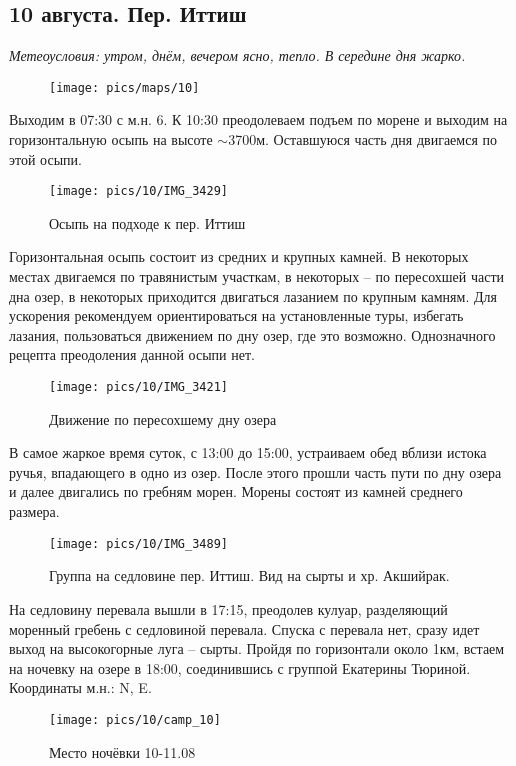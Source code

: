 \subsection{10 августа. Пер. Иттиш}
\textit{Метеоусловия: утром, днём, вечером ясно, тепло. В середине дня жарко.}

\begin{figure}[h!]
	\centering
		\texttt{[image: pics/maps/10]}
	\label{fig:mini_10}
\end{figure}

Выходим в \alert{07:30} с м.н. 6. К \alert{10:30} преодолеваем подъем по морене и выходим на горизонтальную осыпь на высоте $\sim$3700м. Оставшуюся часть дня двигаемся по этой осыпи.

\begin{figure}[h!]
	\centering
	\texttt{[image: pics/10/IMG\_3429]}
	\caption{Осыпь на подходе к пер. Иттиш}
	\label{fig:IMG_3429}
\end{figure}

Горизонтальная осыпь состоит из средних и крупных камней. В некоторых местах двигаемся по травянистым участкам, в некоторых -- по пересохшей части дна озер, в некоторых приходится двигаться лазанием по крупным камням. Для ускорения рекомендуем ориентироваться на установленные туры, избегать лазания, пользоваться движением по дну озер, где это возможно. Однозначного рецепта преодоления данной осыпи нет.

\begin{figure}[h!]
	\centering
	\texttt{[image: pics/10/IMG\_3421]}
	\caption{Движение по пересохшему дну озера}
	\label{fig:IMG_3421}
\end{figure}

В самое жаркое время суток, с 13:00 до 15:00, устраиваем обед вблизи истока ручья, впадающего в одно из озер. После этого прошли часть пути по дну озера и далее двигались по гребням морен. Морены состоят из камней среднего размера.

\begin{figure}[h!]
	\centering
	\texttt{[image: pics/10/IMG\_3489]}
	\caption{Группа на седловине пер. Иттиш. Вид на сырты и хр. Акшийрак.}
	\label{fig:IMG_3489}
\end{figure}

На седловину перевала вышли в \alert{17:15}, преодолев кулуар, разделяющий моренный гребень с седловиной перевала. Спуска с перевала нет, сразу идет выход на высокогорные луга -- сырты. Пройдя по горизонтали около 1км, встаем на ночевку на озере в 18:00, соединившись с группой Екатерины Тюриной. Координаты м.н.: \alert{N\degree, E\degree}.

\begin{figure}[h!]
	\centering
		\texttt{[image: pics/10/camp\_10]}
	\caption{Место ночёвки 10-11.08}
	\label{fig:camp_10}
\end{figure}

\clearpage